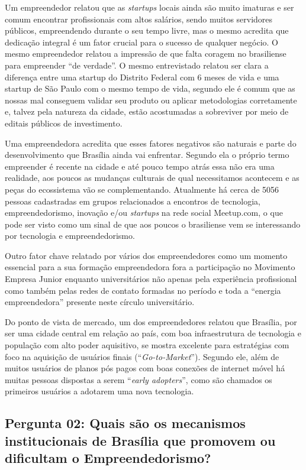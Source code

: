 Um empreendedor relatou que as \textit{startups} locais ainda são muito imaturas e ser comum encontrar profissionais com altos salários, sendo muitos servidores públicos, empreendendo durante o seu tempo livre, mas o mesmo acredita que dedicação integral é um fator crucial para o sucesso de qualquer negócio. O mesmo empreendedor relatou a impressão de que falta coragem no brasiliense para empreender ``de verdade''. O mesmo entrevistado relatou ser clara a diferença entre uma startup do Distrito Federal com 6 meses de vida e uma startup de São Paulo com o mesmo tempo de vida, segundo ele é comum que as nossas mal conseguem validar seu produto ou aplicar metodologias corretamente e, talvez pela natureza da cidade, estão acostumadas a sobreviver por meio de editais públicos de investimento.

Uma empreendedora acredita que esses fatores negativos são naturais e parte do desenvolvimento que Brasília ainda vai enfrentar. Segundo ela o próprio termo empreender é recente na cidade e até pouco tempo atrás essa não era uma realidade, aos poucos as mudanças culturais de qual necessitamos acontecem e as peças do ecossistema vão se complementando. Atualmente há cerca de 5056 pessoas cadastradas em grupos relacionados a encontros de tecnologia, empreendedorismo, inovação e/ou \textit{startups} na rede social Meetup.com, o que pode ser visto como um sinal de que aos poucos o brasiliense vem se interessando por tecnologia e empreendedorismo.

Outro fator chave relatado por vários dos empreendedores como um momento essencial para a sua formação empreendedora fora a participação no Movimento Empresa Junior enquanto universitários não apenas pela experiência profissional como também pelas redes de contato formadas no período e toda a ``energia empreendedora'' presente neste círculo universitário. 

Do ponto de vista de mercado, um dos empreendedores relatou que Brasília, por ser uma cidade central em relação ao país, com boa infraestrutura de tecnologia e população com alto poder aquisitivo, se mostra excelente para estratégias com foco na aquisição de usuários finais (``\textit{Go-to-Market}''). Segundo ele, além de muitos usuários de planos pós pagos com boas conexões de internet móvel há muitas pessoas dispostas a serem ``\textit{early adopters}'', como são chamados os primeiros usuários a adotarem uma nova tecnologia.

\subsection*{Pergunta 02: Quais são os mecanismos institucionais de Brasília que promovem ou dificultam o Empreendedorismo?}
\label{subsection:pergunta_de_pesquisa_2}

